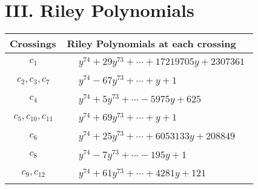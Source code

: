 \documentclass[1p]{elsarticle_modified}
\theoremstyle{definition}
\begin{document}
\centering \section*{ III. Riley Polynomials}
\begin{tabular}{m{50pt}|m{274pt}}
Crossings & \hspace{64pt}Riley Polynomials at each crossing \\
\hline $$\begin{aligned}c_{1}\end{aligned}$$&$\begin{aligned}
&y^{74}+29 y^{73}+\cdots+17219705 y+2307361
\end{aligned}$\\
\hline $$\begin{aligned}c_{2},c_{3},c_{7}\end{aligned}$$&$\begin{aligned}
&y^{74}-67 y^{73}+\cdots+y+1
\end{aligned}$\\
\hline $$\begin{aligned}c_{4}\end{aligned}$$&$\begin{aligned}
&y^{74}+5 y^{73}+\cdots-5975 y+625
\end{aligned}$\\
\hline $$\begin{aligned}c_{5},c_{10},c_{11}\end{aligned}$$&$\begin{aligned}
&y^{74}+69 y^{73}+\cdots+y+1
\end{aligned}$\\
\hline $$\begin{aligned}c_{6}\end{aligned}$$&$\begin{aligned}
&y^{74}+25 y^{73}+\cdots+6053133 y+208849
\end{aligned}$\\
\hline $$\begin{aligned}c_{8}\end{aligned}$$&$\begin{aligned}
&y^{74}-7 y^{73}+\cdots-195 y+1
\end{aligned}$\\
\hline $$\begin{aligned}c_{9},c_{12}\end{aligned}$$&$\begin{aligned}
&y^{74}+61 y^{73}+\cdots+4281 y+121
\end{aligned}$\\
\hline
\end{tabular}
\vskip 2pc
\end{document}
